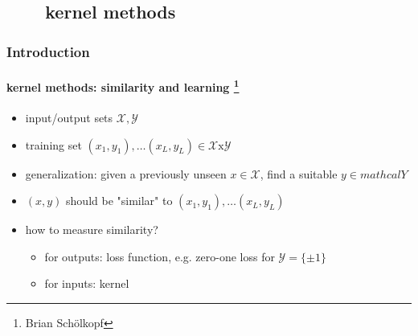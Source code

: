 \subsection{\ \ \ \ kernel methods}
\begin{frame}
\frametitle{Introduction}
\framesubtitle{kernel methods: similarity and learning \footnote{Brian Sch\"{o}lkopf}}
\logoCSIPCPL\mypagenum
	\begin{itemize}
		\item input/output sets $\mathcal{X, Y}$
		\item training set $(x_1, y_1), \ldots (x_L, y_L) \in \mathcal{X} \mbox{x} \mathcal{Y}$
		\item {\color{red}generalization}: given a previously unseen $x \in \mathcal{X}$, find a suitable $y \in mathcal{Y}$
		\item $(x,y)$ should be {\color{red}"similar"} to $(x_1, y_1), \ldots (x_L, y_L)$
		\item how to measure similarity?
			\begin{itemize}
				\item for outputs: {\color{red}loss function}, e.g. zero-one loss for $\mathcal{Y} = \{\pm 1\}$
				\item for inputs: {\color{red}kernel}
			\end{itemize}
	\end{itemize}
\end{frame}



